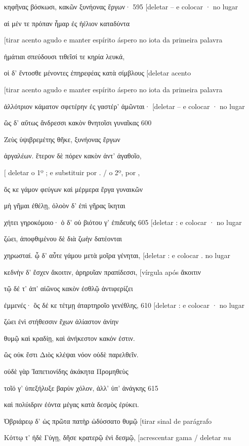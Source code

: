 κηφῆνας βόσκωσι, κακῶν ξυνήονας ἔργων· 595 {[}deletar -- e colocar · no
lugar

αἱ μέν τε πρόπαν ἦμαρ ἐς ἠέλιον καταδύντα

{[}tirar acento agudo e manter espírito áspero no iota da primeira
palavra

ἠμάτιαι σπεύδουσι τιθεῖσί τε κηρία λευκά,

οἱ δ' ἔντοσθε μένοντες ἐπηρεφέας κατὰ σίμβλους {[}deletar acento

{[}tirar acento agudo e manter espírito áspero no iota da primeira
palavra

ἀλλότριον κάματον σφετέρην ἐς γαστέρ' ἀμῶνται· {[}deletar -- e colocar ·
no lugar

ὣς δ' αὔτως ἄνδρεσσι κακὸν θνητοῖσι γυναῖκας 600

Ζεὺς ὑψιβρεμέτης θῆκε, ξυνήονας ἔργων

ἀργαλέων. ἕτερον δὲ πόρεν κακὸν ἀντ' ἀγαθοῖο,

{[} deletar o 1º ; e substituir por . / o 2º, por ,

ὅς κε γάμον φεύγων καὶ μέρμερα ἔργα γυναικῶν

μὴ γῆμαι ἐθέλῃ, ὀλοὸν δ' ἐπὶ γῆρας ἵκηται

χήτει γηροκόμοιο· ὁ δ' οὐ βιότου γ' ἐπιδευὴς 605 {[}deletar : e colocar
· no lugar

ζώει, ἀποφθιμένου δὲ διὰ ζωὴν δατέονται

χηρωσταί. ᾧ δ' αὖτε γάμου μετὰ μοῖρα γένηται, {[}deletar : e colocar .
no lugar

κεδνὴν δ' ἔσχεν ἄκοιτιν, ἀρηρυῖαν πραπίδεσσι, {[}vírgula após ἄκοιτιν

τῷ δέ τ' ἀπ' αἰῶνος κακὸν ἐσθλῷ ἀντιφερίζει

ἐμμενές· ὃς δέ κε τέτμῃ ἀταρτηροῖο γενέθλης, 610 {[}deletar : e colocar
· no lugar

ζώει ἐνὶ στήθεσσιν ἔχων ἀλίαστον ἀνίην

θυμῷ καὶ κραδίῃ, καὶ ἀνήκεστον κακόν ἐστιν.

ὣς οὐκ ἔστι Διὸς κλέψαι νόον οὐδὲ παρελθεῖν.

οὐδὲ γὰρ Ἰαπετιονίδης ἀκάκητα Προμηθεὺς

τοῖό γ' ὑπεξήλυξε βαρὺν χόλον, ἀλλ' ὑπ' ἀνάγκης 615

καὶ πολύιδριν ἐόντα μέγας κατὰ δεσμὸς ἐρύκει.

Ὀβριάρεῳ δ' ὡς πρῶτα πατὴρ ὠδύσσατο θυμῷ {[}tirar sinal de parágrafo

Κόττῳ τ' ἠδὲ Γύγῃ, δῆσε κρατερῷ ἐνὶ δεσμῷ, {[}acrescentar gama / deletar
\emph{nu}

